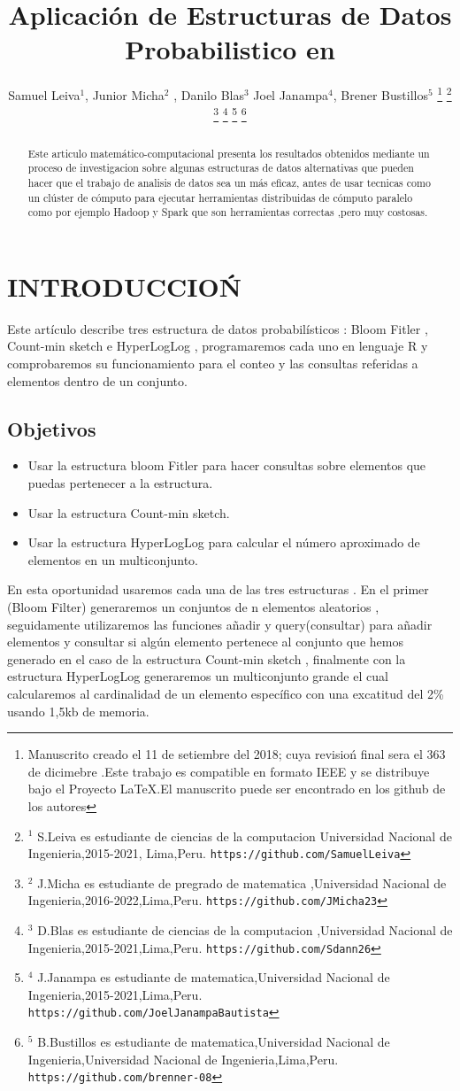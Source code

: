 \documentclass[journal]{IEEEtran}
\title{\LARGE \bf Aplicaci\'on de Estructuras de Datos Probabilistico en
}
\author{Samuel Leiva$^{1}$, Junior Micha$^{2}$ , Danilo Blas$^{3}$ Joel Janampa$^{4}$, Brener Bustillos$^{5}$%
\thanks{Manuscrito creado el 11 de setiembre del 2018; cuya revisio\'n final sera el 363 de dicimebre .Este trabajo es compatible en formato IEEE y se distribuye bajo el Proyecto LaTeX.El manuscrito puede ser encontrado en los github de los autores}%
\thanks{$^{1}$ S.Leiva es estudiante de ciencias de la computacion 
        Universidad Nacional de Ingenieria,2015-2021, Lima,Peru.
        {\tt\small https://github.com/SamuelLeiva}}%
\thanks{$^{2}$ J.Micha es estudiante de pregrado de matematica ,Universidad Nacional de Ingenieria,2016-2022,Lima,Peru.
        {\tt\small https://github.com/JMicha23}}%
\thanks{$^{3}$ D.Blas es estudiante de ciencias de la computacion ,Universidad Nacional de Ingenieria,2015-2021,Lima,Peru.
        {\tt\small https://github.com/Sdann26}}%
\thanks{$^{4}$ J.Janampa es estudiante de matematica,Universidad Nacional de Ingenieria,2015-2021,Lima,Peru.
        {\tt\small https://github.com/JoelJanampaBautista}}%
\thanks{$^{5}$ B.Bustillos es estudiante de matematica,Universidad Nacional de Ingenieria,Universidad Nacional de Ingenieria,Lima,Peru. 
        {\tt\small https://github.com/brenner-08}}%
}
\begin{document}
\maketitle
\thispagestyle{empty}
\pagestyle{empty}


\begin{abstract}
    

Este articulo matemático-computacional presenta los resultados obtenidos mediante un proceso de investigacion sobre algunas estructuras de datos alternativas que pueden hacer que el trabajo de analisis de datos sea un más eficaz, antes de usar tecnicas como un clúster de cómputo para ejecutar herramientas distribuidas de cómputo paralelo como por ejemplo  Hadoop y Spark que son herramientas correctas ,pero muy costosas.

\end{abstract}


\section{INTRODUCCIO\'N}

Este artículo describe tres estructura de datos probabilísticos : Bloom Fitler , Count-min sketch e HyperLogLog , programaremos cada uno en lenguaje R y comprobaremos su funcionamiento para el conteo y las consultas referidas a elementos dentro de un conjunto.
\subsection{Objetivos}
\begin{itemize}
    \item Usar la estructura bloom Fitler para hacer consultas sobre elementos que puedas pertenecer a la estructura. 
    \item Usar la estructura Count-min sketch.
    \item Usar la estructura HyperLogLog para calcular el número aproximado de elementos en un multiconjunto. 
\end{itemize}
En esta oportunidad usaremos cada una de las tres estructuras  . En el primer (Bloom Filter) generaremos un conjuntos de n elementos aleatorios , seguidamente utilizaremos las funciones añadir y query(consultar) para añadir elementos y consultar si algún elemento pertenece al conjunto que hemos generado en el caso de la estructura Count-min sketch , finalmente con la estructura HyperLogLog generaremos un multiconjunto grande el cual calcularemos al cardinalidad de un elemento específico con una excatitud del 2\% usando 1,5kb de memoria.
\end{document}
